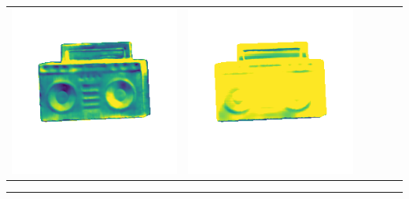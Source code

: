 \begin{tabularx}{\linewidth}{@{}Y@{}Y@{}Y@{}Y@{}Y@{}Y@{}}
\includegraphics[width=\linewidth]{semisynthetic/20150514_19_marrnet_err.png} &
\includegraphics[width=\linewidth]{semisynthetic/20150514_19_ef_err.png} \\
\end{tabularx}
\begin{center}\rule{0.5\linewidth}{\linethickness}\end{center}

